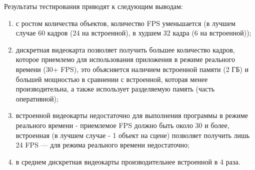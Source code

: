 Результаты тестирования приводят к следующим выводам:
\begin{enumerate}[label=\arabic*)]
	\item с ростом количества объектов, количество FPS уменьшается (в лучшем случае 60 кадров (24 на встроенной), в худшем 32 кадра (6 на встроенной));
	\item дискретная видеокарта позволяет получить большее количество кадров, которое приемлемо для использования приложения в режиме реального времени (30+ FPS),
	это объясняется наличием встроенной памяти (2 ГБ) и большей мощностью в сравнении с встроенной, которая менее производительна, а также использует разделяемую память (часть оперативной);
	\item встроенной видеокарты недостаточно для выполнения программы в режиме реального времени - приемлемое FPS должно быть около 30 и более, встроенная 
	(в лучшем случае - 1 объект на сцене) позволяет получить лишь 24 FPS ---  для режима реального времени недостаточно;
	\item в среднем дискретная видеокарты производительнее встроенной в 4 раза.
\end{enumerate}


